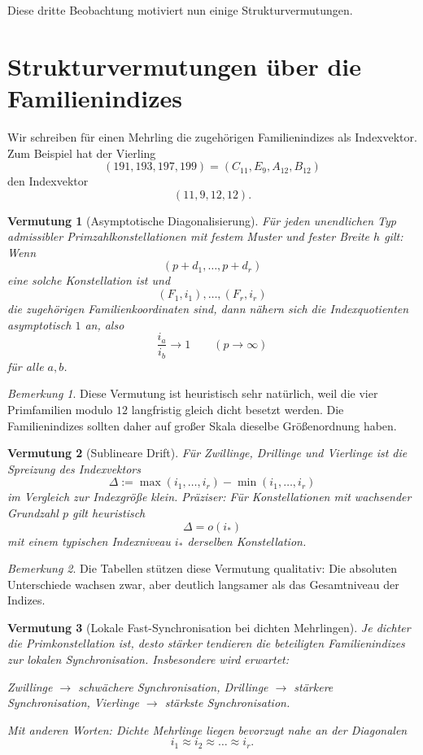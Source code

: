 \documentclass[11pt,a4paper]{article}
\theoremstyle{plain}
\newtheorem{vermutung}{Vermutung}
\theoremstyle{definition}
\theoremstyle{remark}
\newtheorem{bemerkung}{Bemerkung}
\begin{document}
Diese dritte Beobachtung motiviert nun einige Strukturvermutungen.

\section{Strukturvermutungen über die Familienindizes}

Wir schreiben für einen Mehrling die zugehörigen Familienindizes als Indexvektor. Zum Beispiel hat der Vierling
\[
(191,193,197,199)=(C_{11},E_{9},A_{12},B_{12})
\]
den Indexvektor
\[
(11,9,12,12).
\]

\begin{vermutung}[Asymptotische Diagonalisierung]
Für jeden unendlichen Typ admissibler Primzahlkonstellationen mit festem Muster und fester Breite $h$ gilt: Wenn
\[
(p+d_1,\dots,p+d_r)
\]
eine solche Konstellation ist und
\[
(F_1,i_1),\dots,(F_r,i_r)
\]
die zugehörigen Familienkoordinaten sind, dann nähern sich die Indexquotienten asymptotisch $1$ an, also
\[
\frac{i_a}{i_b}\longrightarrow 1
\qquad (p\to\infty)
\]
für alle $a,b$.
\end{vermutung}

\begin{bemerkung}
Diese Vermutung ist heuristisch sehr natürlich, weil die vier Primfamilien modulo $12$ langfristig gleich dicht besetzt werden. Die Familienindizes sollten daher auf großer Skala dieselbe Größenordnung haben.
\end{bemerkung}

\begin{vermutung}[Sublineare Drift]
Für Zwillinge, Drillinge und Vierlinge ist die Spreizung des Indexvektors
\[
\Delta:=\max(i_1,\dots,i_r)-\min(i_1,\dots,i_r)
\]
im Vergleich zur Indexgröße klein. Präziser: Für Konstellationen mit wachsender Grundzahl $p$ gilt heuristisch
\[
\Delta=o(i_\ast)
\]
mit einem typischen Indexniveau $i_\ast$ derselben Konstellation.
\end{vermutung}

\begin{bemerkung}
Die Tabellen stützen diese Vermutung qualitativ: Die absoluten Unterschiede wachsen zwar, aber deutlich langsamer als das Gesamtniveau der Indizes.
\end{bemerkung}

\begin{vermutung}[Lokale Fast-Synchronisation bei dichten Mehrlingen]
Je dichter die Primkonstellation ist, desto stärker tendieren die beteiligten Familienindizes zur lokalen Synchronisation. Insbesondere wird erwartet:
\begin{center}
Zwillinge $\to$ schwächere Synchronisation,\qquad
Drillinge $\to$ stärkere Synchronisation,\qquad
Vierlinge $\to$ stärkste Synchronisation.
\end{center}
Mit anderen Worten: Dichte Mehrlinge liegen bevorzugt nahe an der Diagonalen
\[
i_1\approx i_2\approx\dots\approx i_r.
\]
\end{vermutung}
\end{document}
